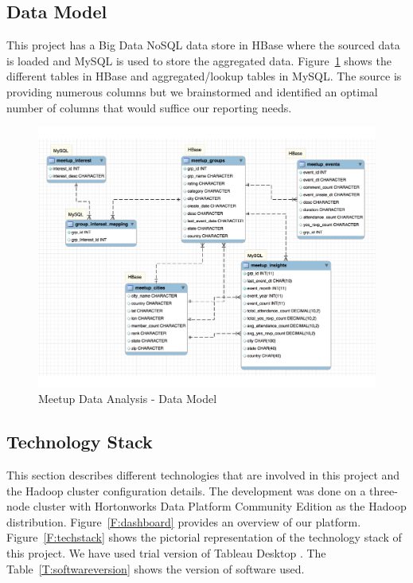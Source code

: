 \documentclass{acm_proc_article-sp}
\begin{document}
\subsection{Data Model}
This project has a Big Data NoSQL data store in HBase where the sourced data is loaded and MySQL is used to store the aggregated data.  Figure~\ref{F:datamodel} shows the different tables in HBase and aggregated/lookup tables in MySQL.  The source is providing numerous columns but we brainstormed and identified an optimal number of columns that would suffice our reporting needs.
\begin{figure}[!ht]
  \centering
      \includegraphics[width=1.0\columnwidth]{images/data_model.pdf}
  \caption{Meetup Data Analysis - Data Model}\label{F:datamodel}
\end{figure}

\subsection{Technology Stack}
This section describes different technologies that are involved in this project and the Hadoop cluster configuration details.  The development was done on a three-node cluster with Hortonworks Data Platform Community Edition \cite{www-hdp} as the Hadoop distribution.  Figure~\ref{F:dashboard} provides an overview of our platform. Figure~\ref{F:techstack} shows the pictorial representation of the technology stack of this project.  We have used trial version of Tableau Desktop \cite{www-tableau}.  The Table~\ref{T:softwareversion} shows the version of software used.
\end{document}
